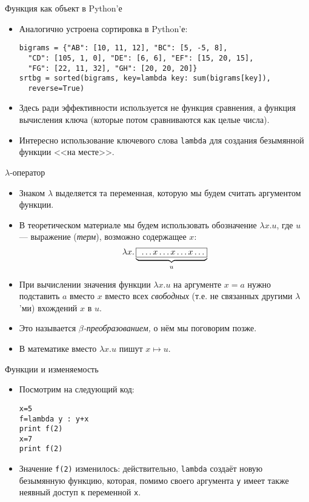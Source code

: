 \documentclass[xcolor=dvipsnames]{beamer}
\begin{document}
\begin{frame}[fragile]{Функция как объект в Python'е}

\begin{itemize}[<+->]
 \item Аналогично устроена сортировка в Python'е:
\begin{verbatim}
bigrams = {"AB": [10, 11, 12], "BC": [5, -5, 8],
  "CD": [105, 1, 0], "DE": [6, 6], "EF": [15, 20, 15], 
  "FG": [22, 11, 32], "GH": [20, 20, 20]}
srtbg = sorted(bigrams, key=lambda key: sum(bigrams[key]), 
  reverse=True)
\end{verbatim}
\item Здесь ради эффективности используется не функция сравнения, а функция вычисления ключа (которые потом сравниваются как целые числа).
\item Интересно использование ключевого слова \texttt{lambda} для создания безымянной функции <<на месте>>.
\end{itemize}
 
\end{frame}

\begin{frame}{$\lambda$-оператор}

\begin{itemize}[<+->]
 \item Знаком $\lambda$ выделяется та переменная, которую мы будем считать аргументом функции.
 \item В теоретическом материале мы будем использовать обозначение $\lambda x. u$, где $u$ --- выражение ({\em терм}), возможно содержащее $x$:
 \[
  \lambda x . \underbrace{\mbox{\fbox{ $\ldots x \ldots x \ldots x \ldots$}}}_u
 \]
 \item При вычислении значения функции $\lambda x . u$ на аргументе $x = a$ нужно подставить $a$ вместо $x$ вместо всех {\em свободных} (т.е. не связанных другими $\lambda$'ми) вхождений $x$ в $u$.
 \item Это называется {\em $\beta$-преобразованием,} о нём мы поговорим позже.
 \item В математике вместо $\lambda x .u $ пишут $x \mapsto u$.
\end{itemize}


 
\end{frame}

\begin{frame}[fragile]{Функции и изменяемость}

\begin{itemize}[<+->]
 \item Посмотрим на следующий код:
\begin{verbatim}
x=5
f=lambda y : y+x
print f(2)
x=7
print f(2)
\end{verbatim}
\item Значение \texttt{f(2)} изменилось: действительно, \texttt{lambda} создаёт новую безымянную функцию, которая, помимо своего аргумента \texttt{y} имеет также неявный доступ к переменной \texttt{x}.
\end{itemize}

 
\end{frame}
\end{document}
